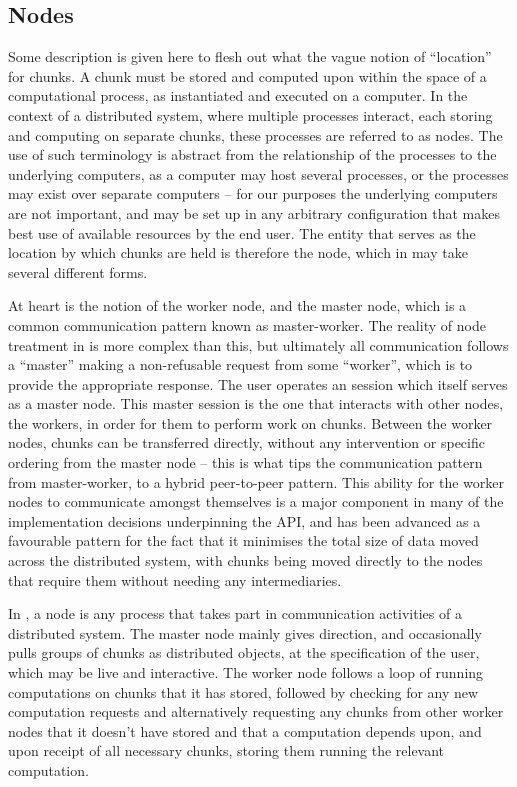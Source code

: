 \subsection{Nodes}\label{sec:node}

Some description is given here to flesh out what the vague notion of ``location'' for chunks.
A chunk must be stored and computed upon within the space of a computational process, as instantiated and executed on a computer.
In the context of a distributed system, where multiple processes interact, each storing and computing on separate chunks, these processes are referred to as nodes.
The use of such terminology is abstract from the relationship of the processes to the underlying computers, as a computer may host several processes, or the processes may exist over separate computers -- for our purposes the underlying computers are not important, and may be set up in any arbitrary configuration  that makes best use of available resources by the end user.
The entity that serves as the location by which chunks are held is therefore the node, which in \lsr{} may take several different forms.

At heart is the notion of the worker node, and the master node, which is a common communication pattern known as master-worker\cite{rfc2136}.
The reality of node treatment in \lsr{} is more complex than this, but ultimately all communication follows a ``master'' making a non-refusable request from some ``worker'', which is to provide the appropriate response.
The user operates an \R{} session which itself serves as a master node.
This master session is the one that interacts with other nodes, the workers, in order for them to perform work on chunks.
Between the worker nodes, chunks can be transferred directly, without any intervention or specific ordering from the master node -- this is what tips the communication pattern from master-worker, to a hybrid peer-to-peer pattern.
This ability for the worker nodes to communicate amongst themselves is a major component in many of the implementation decisions underpinning the API, and has been advanced as a favourable pattern for the fact that it minimises the total size of data moved across the distributed system, with chunks being moved directly to the nodes that require them without needing any intermediaries.

In \lsr{}, a node is any process that takes part in communication activities of a distributed system.
The master node mainly gives direction, and occasionally pulls groups of chunks as distributed objects, at the specification of the user, which may be live and interactive.
The worker node follows a loop of running computations on chunks that it has stored, followed by checking for any new computation requests and alternatively requesting any chunks from other worker nodes that it doesn't have stored and that a computation depends upon, and upon receipt of all necessary chunks, storing them running the relevant computation.

